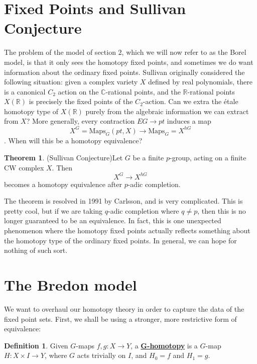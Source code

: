 \documentclass{article}
\theoremstyle{definition}
\newtheorem{theorem}{Theorem}[section]
\theoremstyle{definition}
\newtheorem{definition}{Definition}[theorem]
\theoremstyle{definition}
\theoremstyle{definition}
\theoremstyle{definition}
\theoremstyle{definition}
\theoremstyle{definition}
\begin{document}
\section{Fixed Points and Sullivan Conjecture}
The problem of the model of section $2$, which we will now refer to as the Borel model, is that it only sees the homotopy fixed points, and sometimes we do want information about the ordinary fixed points. Sullivan originally considered the following situation: given a complex variety $X$ defined by real polynomials, there is a canonical $C_2$ action on the $\mathbb{C}$-rational points, and the $\mathbb{R}$-rational points $X(\mathbb{R})$ is precisely the fixed points of the $C_2$-action. Can we extra the \'etale homotopy type of $X(\mathbb{R})$ purely from the algebraic information we can extract from $X$? More generally, every contraction $EG\to pt$ induces a map 
\[X^G=\textrm{Maps}_G(pt, X)\to \textrm{Maps}_G=X^{hG}\].  
When will this be a homotopy equivalence? 



\begin{tcolorbox}[colback=red!5!white,colframe=red!30!white]
    \begin{theorem}
    (Sullivan Conjecture)Let $G$ be a finite $p$-group, acting on a finite CW complex $X$. Then
    \[X^G\to X^{hG}\]
    becomes a homotopy equivalence after $p$-adic completion. 
    \end{theorem}
    \end{tcolorbox}
    The theorem is resolved in 1991 by Carlsson, and is very complicated. This is pretty cool, but if we are taking $q$-adic completion where $q\neq p$, then this is no longer guaranteed to be an equivalence. In fact, this is one unexpected phenomenon where the homotopy fixed points actually reflects something about the homotopy type of the ordinary fixed points. In general, we can hope for nothing of such sort. 

\section{The Bredon model}
We want to overhaul our homotopy theory in order to capture the data of the fixed point sets. First, we shall be using a stronger, more restrictive form of equivalence:


\begin{tcolorbox}[colback=purple!5!white,colframe=purple!75!black]
\begin{definition}
Given $G$-maps $f,g: X\to Y$, a \underline{\textbf{G-homotopy}} is a $G$-map $H: X\times I\to Y $, where $G$ acts trivially on $I$, and $H_0=f$ and $H_1=g$.
\end{definition}
\end{tcolorbox}
\end{document}
